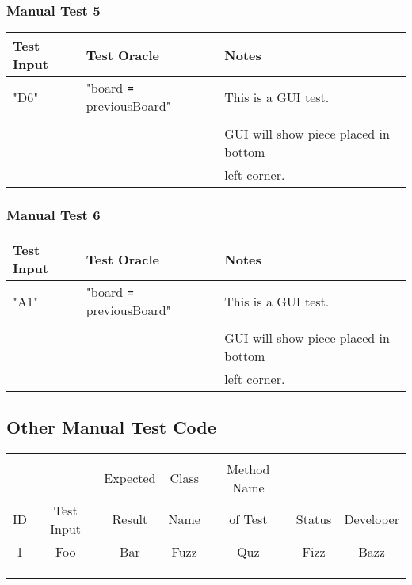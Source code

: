 \documentclass[11pt]{article}
\begin{document}
\subsubsection{Manual Test 5}
\label{sec:orgd65a4d0}
\begin{center}
\begin{tabular}{|p{4.0cm}|p{6.0cm}|p{3.0cm}|}
Test Input & Test Oracle & Notes\\
\hline
"D6" & "board \texttt{=} previousBoard" & This is a GUI test.\\
 &  & \\
 &  & GUI will show piece placed in bottom\\
 &  & left corner.\\
\end{tabular}
\end{center}
\subsubsection{Manual Test 6}
\label{sec:org6b4f489}
\begin{center}
\begin{tabular}{|p{4.0cm}|p{6.0cm}|p{3.0cm}|}
Test Input & Test Oracle & Notes\\
\hline
"A1" & "board \texttt{=} previousBoard" & This is a GUI test.\\
 &  & \\
 &  & GUI will show piece placed in bottom\\
 &  & left corner.\\
\end{tabular}
\end{center}
\subsection{Other Manual Test Code}
\label{sec:org21eb0cb}

\begin{center}
\begin{tabular}{|c|c|c|c|c|c|c|}
 &  &  &  &  &  & \\
 &  & Expected & Class & Method Name &  & \\
ID & Test Input & Result & Name & of Test & Status & Developer\\
\hline
1 & Foo & Bar & Fuzz & Quz & Fizz & Bazz\\
 &  &  &  &  &  & \\
 &  &  &  &  &  & \\
 &  &  &  &  &  & \\
\end{tabular}
\end{center}
\end{document}
